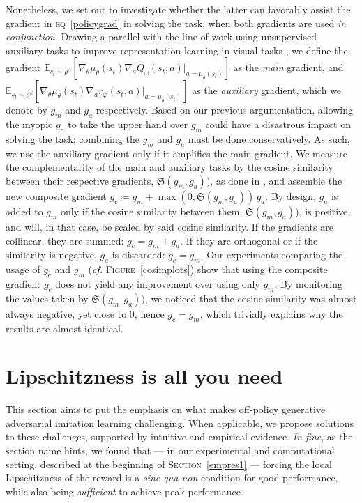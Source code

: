 Nonetheless, we set out to investigate whether the latter can favorably
assist the gradient in \textsc{eq}~\ref{policygrad} in solving the task,
when both gradients are used \emph{in conjunction}.
Drawing a parallel with the line of work using unsupervised auxiliary tasks
to improve representation learning in visual tasks
\cite{Jaderberg2016-sf,Shelhamer2016-kd,Mirowski2016-fm,Doersch2015-fy},
we define the gradient
$\mathbb{E}_{s_t \sim \rho^\beta}[\nabla_\theta \mu_\theta(s_t)
\nabla_a Q_\omega (s_t, a) \rvert_{a = \mu_\theta(s_t)}]$
as the \emph{main} gradient,
and
$\mathbb{E}_{s_t \sim \rho^\beta}[\nabla_\theta \mu_\theta(s_t)
\nabla_a r_\varphi (s_t, a) \rvert_{a = \mu_\theta(s_t)}]$
as the \emph{auxiliary} gradient,
which we denote by $g_m$ and $g_a$ respectively.
Based on our previous argumentation, allowing the myopic $g_a$
to take the upper hand over $g_m$
could have a disastrous impact on solving the task:
combining the $g_m$ and $g_a$ must be done conservatively.
As such, we use the auxiliary gradient only if it amplifies the
main gradient.
We measure the complementarity of the main and auxiliary tasks
by the cosine similarity between their respective gradients, $\mathfrak{S}(g_m, g_a))$,
as done in \cite{Du2018-xc},
and assemble the new composite gradient
$g_c \coloneqq g_m + \max(0, \mathfrak{S}(g_m, g_a)) \, g_a$.
By design, $g_a$ is added to $g_m$ only if the cosine
similarity between them, $\mathfrak{S}(g_m, g_a))$, is positive,
and will, in that case, be scaled by said cosine similarity.
If the gradients are collinear, they are summed: $g_c = g_m + g_a$.
If they are orthogonal or if the similarity is negative, $g_a$ is discarded: $g_c = g_m$.
Our experiments comparing the usage of $g_c$ and $g_m$
(\textit{cf.} \textsc{Figure}~\ref{cosimplots})
show that using the composite gradient $g_c$
does not yield any improvement over using only $g_m$.
By monitoring the values taken by $\mathfrak{S}(g_m, g_a))$,
we noticed that the cosine similarity was almost always negative, yet close to $0$,
hence $g_c = g_m$, which trivially explains why the results are almost identical.

\section{Lipschitzness is all you need}
\label{lipalluneed}

This section aims to
put the emphasis on what makes off-policy generative adversarial imitation learning
challenging.
When applicable, we propose solutions to these challenges,
supported by intuitive and empirical evidence.
\textit{In fine}, as the section name hints, we found that
--- in our experimental and computational setting,
described at the beginning of \textsc{Section}~\ref{empres1} ---
forcing the local Lipschitzness of the reward
is a \emph{sine qua non} condition for good performance,
while also being \emph{sufficient} to achieve peak performance.


